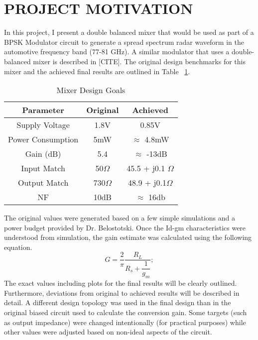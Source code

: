 \documentclass{article}                                                         %
\begin{document}
\section{PROJECT MOTIVATION}
In this project, I present a double balanced mixer that would be used as part of a  BPSK Modulator circuit
to generate a spread spectrum radar waveform in the automotive frequency band (77-81 GHz). A similar modulator
that uses a double-balanced mixer is described in [CITE]. The original design benchmarks for this mixer
and the achieved final results are outlined in Table ~\ref{table:goalsnresults}.\vspace{3mm}
\vspace{3mm}
\begin{table}[H]
\centering
 \begin{tabular}{ | c | c | c |}
   \hline
    \textbf{Parameter} & \textbf{Original} & \textbf{Achieved}  \\
    \hline
    \hline
    Supply Voltage & 1.8V & 0.85V \\
    \hline
    Power Consumption & 5mW & $\approx$ 4.8mW\\
    \hline
    Gain (dB)   & 5.4 & $\approx$ -13dB \\
    \hline
    Input Match  & 50$\Omega$ & 45.5 + j0.1 $\Omega$ \\
    \hline
    Output Match & 730$\Omega$ & 48.9 + j0.1$\Omega$ \\
    \hline
    NF & 10dB & $\approx$ 16db \\
    \hline
  \end{tabular}
  \caption{Mixer Design Goals}
  \label{table:goalsnresults}
\end{table}
The original values were generated based on a few simple simulations and a power budget provided by Dr. Belostotski. Once the Id-gm
characteristics were understood from simulation, the gain estimate was calculated using the following equation.
\begin{equation}
  \label{eq:idealgain}
  G=\dfrac{2}{\pi}\dfrac{R_L}{R_s + \dfrac{1}{g_m}};
\end{equation}
The exact values including plots for the final results will be clearly outlined. Furthermore, deviations from original to achieved results
will be described in detail. A different design topology was used in the final design than in the original biased circuit used to calculate
the conversion gain. Some targets (such as output impedance) were changed intentionally (for practical purposes) while other values
were adjusted based on non-ideal aspects of the circuit.\vspace{3mm}
\end{document}
